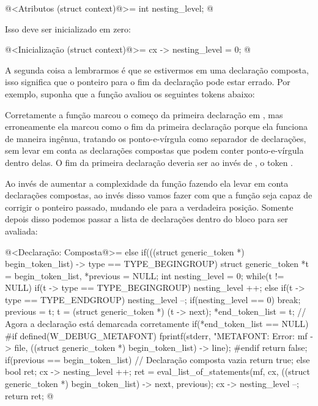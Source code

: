 \iniciocodigo
@<Atributos (struct context)@>=
  int nesting_level;
@
\fimcodigo

Isso deve ser inicializado em zero:

\iniciocodigo
@<Inicialização (struct context)@>=
  cx -> nesting_level = 0;
@
\fimcodigo

A segunda coisa a lembrarmos é que se estivermos em uma declaração
composta, isso significa que o ponteiro para o fim da declaração pode
estar errado. Por exemplo, suponha que a função
 avaliou os seguintes tokens
abaixo:

\alinhaverbatim
[begingroup][T1][T2][;][T3][T4][;][endgroup][;]
\alinhanormal

Corretamente a função marcou o começo da primeira declaração
em , mas erroneamente ela
marcou  como o fim da primeira declaração porque ela
funciona de maneira ingênua, tratando os ponto-e-vírgula como
separador de declarações, sem levar em conta as declarações compostas
que podem conter ponto-e-vírgula dentro delas. O fim da primeira
declaração deveria ser ao invés de , o
token .

Ao invés de aumentar a complexidade da
função  fazendo ela levar em
conta declarações compostas, ao invés disso vamos fazer com que a
função  seja capaz de corrigir o ponteiro
passado, mudando ele para a verdadeira posição. Somente depois disso
podemos passar a lista de declarações dentro do bloco para ser
avaliada:

\iniciocodigo
@<Declaração: Composta@>=
else if(((struct generic_token *) begin_token_list) -> type ==
        TYPE_BEGINGROUP){
  struct generic_token *t = begin_token_list, *previous = NULL;
  int nesting_level = 0;
  while(t != NULL){
    if(t -> type == TYPE_BEGINGROUP)
      nesting_level ++;
    else if(t -> type == TYPE_ENDGROUP){
      nesting_level --;
      if(nesting_level == 0)
        break;
    }
    previous = t;
    t = (struct generic_token *) (t -> next);
  }
  *end_token_list = t; // Agora a declaração está demarcada corretamente
  if(*end_token_list == NULL){
#if defined(W_DEBUG_METAFONT)
    fprintf(stderr, "METAFONT: Error: %
            mf -> file,
            ((struct generic_token *) begin_token_list) -> line);
#endif
    return false;
  }
  if(previous == begin_token_list) // Declaração composta vazia
    return true;
  else{
    bool ret;
    cx -> nesting_level ++;
    ret = eval_list_of_statements(mf, cx, ((struct generic_token *)
                                         begin_token_list) -> next,
                                  previous);
    cx -> nesting_level --;
    return ret;
  }
}
@
\fimcodigo

